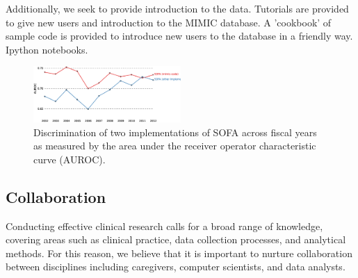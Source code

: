 \documentclass{bioinfo}
\begin{document}
\begin{methods}
Additionally, we seek to provide introduction to the data. Tutorials are provided to give new users and introduction to the MIMIC database. A 'cookbook' of sample code is provided to introduce new users to the database in a friendly way. Ipython notebooks.




\begin{figure}[!tpb]%
\centerline{\includegraphics[width=0.5\textwidth]{SOFA.eps}}
\caption{Discrimination of two implementations of SOFA across fiscal years as measured by the area under the receiver operator characteristic curve (AUROC).}\label{fig:SevScoresOverTime}
\end{figure}


\subsection{Collaboration}

Conducting effective clinical research calls for a broad range of knowledge, covering areas such as clinical practice, data collection processes, and analytical methods. For this reason, we believe that it is important to nurture collaboration between disciplines including caregivers, computer scientists, and data analysts.


\end{methods}
\end{document}
